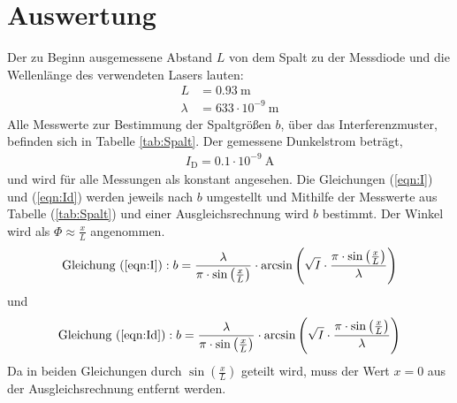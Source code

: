 \section{Auswertung}
\label{sec:Auswertung}

Der zu Beginn ausgemessene Abstand $L$ von dem Spalt zu der Messdiode und die Wellenlänge des verwendeten Lasers lauten:
\begin{align*}
  L &= 0.93 \ \text{m} \\
  \lambda &= 633 \cdot 10^{-9} \ \text{m}
\end{align*}
Alle Messwerte zur Bestimmung der Spaltgrößen $b$, über das Interferenzmuster, befinden sich in Tabelle \ref{tab:Spalt}. Der gemessene Dunkelstrom beträgt,
\begin{align*}
  I_\text{D} = 0.1 \cdot 10^{-9} \ \text{A}
\end{align*}
und wird für alle Messungen als konstant angesehen. Die Gleichungen (\ref{eqn:I}) und (\ref{eqn:Id}) werden jeweils nach $b$ umgestellt und Mithilfe der Messwerte aus Tabelle (\ref{tab:Spalt}) und einer Ausgleichsrechnung wird $b$ bestimmt. Der Winkel wird als $\Phi \approx \frac{x}{L}$ angenommen.
\begin{equation}
  \text{Gleichung (\ref{eqn:I})}: b = \frac{\lambda}{\pi \cdot \sin\left(\frac{x}{L}\right)} \cdot \arcsin\left(\sqrt{I} \cdot \frac{\pi \cdot \sin\left(\frac{x}{L}\right)}{\lambda}\right)
\end{equation}
und
\begin{equation}
  \text{Gleichung (\ref{eqn:Id})}: b = \frac{\lambda}{\pi \cdot \sin\left(\frac{x}{L}\right)} \cdot \arcsin\left(\sqrt{I} \cdot \frac{\pi \cdot \sin\left(\frac{x}{L}\right)}{\lambda}\right)
\end{equation}
Da in beiden Gleichungen durch $\sin\left(\frac{x}{L} \right)$ geteilt wird, muss der Wert $x = 0$ aus der Ausgleichsrechnung entfernt werden.

